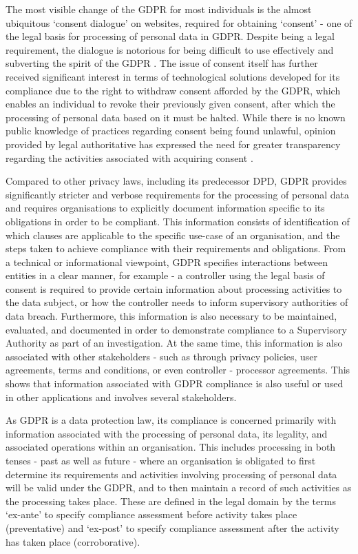 The most visible change of the GDPR for most individuals is the almost ubiquitous `consent dialogue' on websites, required for obtaining `consent' - one of the legal basis for processing of personal data in GDPR.
Despite being a legal requirement, the dialogue is notorious for being difficult to use effectively and subverting the spirit of the GDPR \cite{machuletz_multiple_2019,utz_informed_2019}.
The issue of consent itself has further received significant interest in terms of technological solutions developed for its compliance due to the right to withdraw consent afforded by the GDPR, which enables an individual to revoke their previously given consent, after which the processing of personal data based on it must be halted.
While there is no known public knowledge of practices regarding consent being found unlawful, opinion provided by legal authoritative has expressed the need for greater transparency regarding the activities associated with acquiring consent \cite{opinion_AG_2019}.

Compared to other privacy laws, including its predecessor DPD, GDPR provides significantly stricter and verbose requirements for the processing of personal data and requires organisations to explicitly document information specific to its obligations in order to be compliant.
This information consists of identification of which clauses are applicable to the specific use-case of an organisation, and the steps taken to achieve compliance with their requirements and obligations.
From a technical or informational viewpoint, GDPR specifies interactions between entities in a clear manner, for example - a controller using the legal basis of consent is required to provide certain information about processing activities to the data subject, or how the controller needs to inform supervisory authorities of data breach. Furthermore, this information is also necessary to be maintained, evaluated, and documented in order to demonstrate compliance to a Supervisory Authority as part of an investigation. At the same time, this information is also associated with other stakeholders - such as through privacy policies, user agreements, terms and conditions, or even controller - processor agreements. This shows that information associated with GDPR compliance is also useful or used in other applications and involves several stakeholders.

As GDPR is a data protection law, its compliance is concerned primarily with information associated with the processing of personal data, its legality, and associated operations within an organisation. 
This includes processing in both tenses - past as well as future - where an organisation is obligated to first determine its requirements and activities involving processing of personal data will be valid under the GDPR, and to then maintain a record of such activities as the processing takes place.
These are defined in the legal domain by the terms `ex-ante' to specify compliance assessment before activity takes place (preventative) and `ex-post' to specify compliance assessment after the activity has taken place (corroborative).

